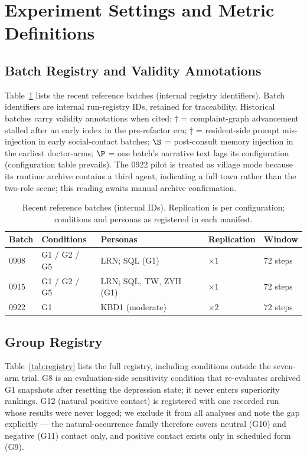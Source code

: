 \documentclass[10pt]{article}
\begin{document}
\section{Experiment Settings and Metric Definitions}\label{app:settings}

\subsection{Batch Registry and Validity Annotations}

Table~\ref{tab:batches} lists the recent reference batches (internal registry identifiers).
Batch identifiers are internal run-registry IDs, retained for traceability.
Historical batches carry validity annotations when cited: $\dagger$ = complaint-graph advancement stalled after an early index in the pre-refactor era; $\ddagger$ = resident-side prompt mis-injection in early social-contact batches; $\S$ = post-consult memory injection in the earliest doctor-arms; $\P$ = one batch's narrative text lags its configuration (configuration table prevails).
The 0922 pilot is treated as village mode because its runtime archive contains a third agent, indicating a full town rather than the two-role scene; this reading awaits manual archive confirmation.

\begin{table}[h]
\centering
\caption{Recent reference batches (internal IDs). Replication is per configuration; conditions and personas as registered in each manifest.}
\label{tab:batches}
\small
\begin{tabular}{@{}lllll@{}}
\toprule
Batch & Conditions & Personas & Replication & Window \\
\midrule
0908 & G1 / G2 / G5 & LRN; SQL (G1) & $\times 1$ & 72 steps \\
0915 & G1 / G2 / G5 & LRN; SQL, TW, ZYH (G1) & $\times 1$ & 72 steps \\
0922 & G1 & KBD1 (moderate) & $\times 2$ & 72 steps \\
\bottomrule
\end{tabular}
\end{table}

\subsection{Group Registry}

Table~\ref{tab:registry} lists the full registry, including conditions outside the seven-arm trial.
G8 is an evaluation-side sensitivity condition that re-evaluates archived G1 snapshots after resetting the depression state; it never enters superiority rankings.
G12 (natural positive contact) is registered with one recorded run whose results were never logged; we exclude it from all analyses and note the gap explicitly --- the natural-occurrence family therefore covers neutral (G10) and negative (G11) contact only, and positive contact exists only in scheduled form (G9).
\end{document}
